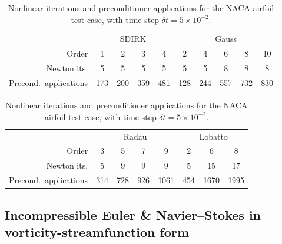 \documentclass[review]{siamart}
\begin{document}
\begin{table}
	\centering
	\caption{Nonlinear iterations and preconditioner applications for the NACA airfoil test case, with time step $\delta t = 5 \times 10^{-2}.$}
	\label{tab:naca-iters}
	\begin{tabular}{r|cccc|ccccc}
		\toprule
		& \multicolumn{4}{c}{SDIRK} & \multicolumn{5}{c}{Gauss} \\
		Order  & 1 & 2 & 3 & 4 & 2 & 4 & 6 & 8 & 10\\
		\midrule
		Newton its. & 5 & 5 & 5 & 5 & 5 & 5 & 8 & 8 & 8\\
		\midrule
		Precond.\ applications & 173 & 200 & 359 & 481 & 128 & 244 & 557 & 732 & 830\\
		\bottomrule
	\end{tabular}

	\vspace{\floatsep}

	\begin{tabular}{r|cccc|ccc}
		\toprule
		& \multicolumn{4}{c}{Radau} & \multicolumn{3}{c}{Lobatto} \\
		Order  & 3 & 5 & 7 & 9 & 2 & 6 & 8\\
		\midrule
		Newton its. & 5 & 9 & 9 & 9 & 5 & 15 & 17\\
		\midrule
		Precond.\ applications & 314 & 728 & 926 & 1061 & 454 & 1670 & 1995\\
		\bottomrule
	\end{tabular}
\end{table}

\subsection{Incompressible Euler \& Navier--Stokes in vorticity-streamfunction form}
\label{sec:numerics:khi}
\end{document}
